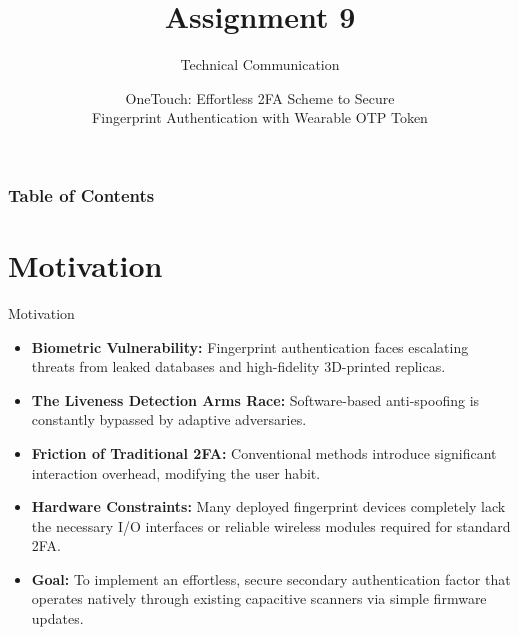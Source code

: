 \documentclass[aspectratio=169,t,xcolor=table]{beamer}
\begin{document}
\title[Inf UFG]{Assignment 9}
\subtitle{Technical Communication}

\author{ OneTouch: Effortless 2FA Scheme to Secure \\ Fingerprint Authentication with Wearable OTP Token}
\date{}
\setLogos{}
\frame[noframenumbering]{\titlepage}

\begin{frame}
    \frametitle{Table of Contents}
    \tableofcontents
\end{frame}

\section{Motivation}
\begin{frame}{Motivation}
    \begin{itemize}
        \item \textbf{Biometric Vulnerability:} Fingerprint authentication faces escalating threats from leaked databases and high-fidelity 3D-printed replicas.
        \item \textbf{The Liveness Detection Arms Race:} Software-based anti-spoofing is constantly bypassed by adaptive adversaries.
        \item \textbf{Friction of Traditional 2FA:} Conventional methods introduce significant interaction overhead, modifying the user habit.
        \item \textbf{Hardware Constraints:} Many deployed fingerprint devices completely lack the necessary I/O interfaces or reliable wireless modules required for standard 2FA.
        \item \textbf{Goal:} To implement an effortless, secure secondary authentication factor that operates natively through existing capacitive scanners via simple firmware updates.
    \end{itemize}
\end{frame}
\end{document}
